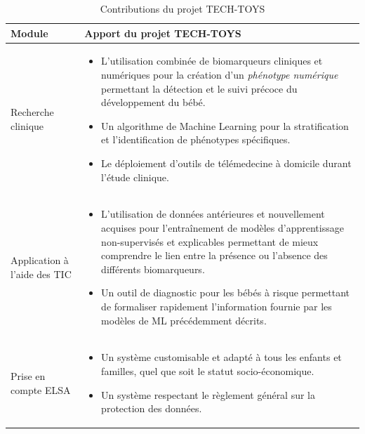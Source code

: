 \documentclass[8pt]{article}
\begin{document}
\begin{table}[H]
\begin{tabularx}{\textwidth}{|p{}|X|}
\rowcolor{lightgray}
Module & Apport du projet TECH-TOYS\\
\hline
Recherche clinique &  
                        \begin{itemize}
                        \item L’utilisation combinée de biomarqueurs cliniques et numériques pour la création d’un \textit{phénotype numérique} permettant la détection et le suivi précoce du développement du bébé.
                        \item Un algorithme de Machine Learning pour la stratification et l’identification de phénotypes spécifiques.
                        \item Le déploiement d’outils de télémedecine à domicile durant l’étude clinique.
                      \end{itemize}
                     \\
\hline

Application à l'aide des TIC &  \begin{itemize}
                        \item L’utilisation de données antérieures et nouvellement acquises pour l’entraînement de modèles d’apprentissage non-supervisés et explicables permettant de mieux comprendre le lien entre la présence ou l’absence des différents biomarqueurs.
                        \item Un outil de diagnostic pour les bébés à risque permettant de formaliser rapidement l’information fournie par les modèles de ML précédemment décrits.
                      \end{itemize}
                     \\
\hline
Prise en compte ELSA & \begin{itemize}
                        \item Un système customisable et adapté à tous les enfants et familles, quel que soit le statut socio-économique.
                        \item Un système respectant le règlement général sur la protection des données.
                      \end{itemize}\\
\hline

\end{tabularx}
\caption{Contributions du projet TECH-TOYS}
\label{}
\end{table}
\end{document}
